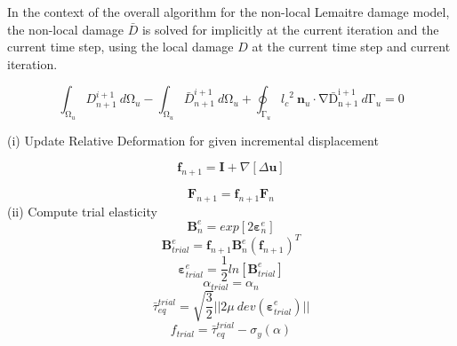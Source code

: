 \documentclass[sn-mathphys,Numbered,draft]{sn-jnl}%
\begin{document}
In the context of the overall algorithm for the non-local Lemaitre damage model, the non-local damage $\bar{D}$ is solved for implicitly at the current iteration and the current time step, using the local damage $D$ at the current time step and current iteration.

\begin{equation}
\int_{\mathrm{\Omega}_u}D^{i+1}_{n+1}\ d\mathrm{\Omega}_u-\int_{\mathrm{\Omega}_u}\bar{D}^{i+1}_{n+1}\ d\mathrm{\Omega}_u+\oint_{\mathrm{\Gamma}_u}{{l_c}^2\ \mathbf{n}_u\cdot\mathrm{\nabla}\mathrm{ \bar{D}^{i+1}_{n+1}}}\ d\mathrm{\Gamma}_u=0
\end{equation}

\begin{algorithm}[H]
\SetAlgoLined
(i) Update Relative Deformation for given incremental displacement

\begin{equation}
  \mathbf{f}_{n+1}=\mathbf{I}+\nabla\left[\Delta\textbf{u}\right]\nonumber
\end{equation}

\begin{equation}
\mathbf{F}_{n+1}=\mathbf{f}_{n+1}\mathbf{F}_n\nonumber
\end{equation}
(ii) Compute trial elasticity
\begin{equation}
\mathbf{B}^{e}_{n}=exp\left[{2\boldsymbol{\varepsilon}^{e}_{n}}\right]\nonumber
\end{equation}
\begin{equation}
\mathbf{B}^{e}_{trial}=\mathbf{f}_{n+1}\mathbf{B}^{e}_{n}(\mathbf{f}_{n+1})^{T}\nonumber
\end{equation}
\begin{equation}
\boldsymbol{\varepsilon}^{e}_{trial}=\frac{1}{2}ln[\textbf{B}^{e}_{trial}]\nonumber
\end{equation}
\begin{equation}
\alpha_{trial}=\alpha_{n}\nonumber
\end{equation}
\begin{equation}
\bar{\tau}_{eq}^{trial}=\sqrt{\frac{3}{2}}\lvert\lvert2\mu\ dev(\boldsymbol{\varepsilon}^{e}_{trial})\rvert\rvert\nonumber\nonumber
\end{equation}
\begin{equation}
f_{trial}=  \bar{\tau}_{eq}^{trial}-\sigma_{y}(\alpha) \nonumber 
\end{equation}


\end{algorithm}
\end{document}
